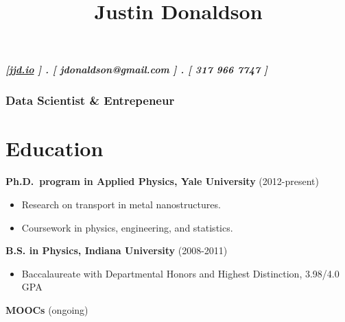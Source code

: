 \documentclass[
]{report}
\title{Justin Donaldson}
\author{}
\date{}
\let\oldparagraph\paragraph
\renewcommand{\paragraph}[1]{\oldparagraph{#1}\mbox{}}
\providecommand{\tightlist}{%
  \setlength{\itemsep}{0pt}\setlength{\parskip}{0pt}}\usepackage{longtable,booktabs,array}
\renewcommand*\contentsname{Table of contents}
\newcommand\contentsname{Table of contents}
\begin{document}
\maketitle
\ifdefined\Shaded\renewenvironment{Shaded}{\begin{tcolorbox}[frame hidden, borderline west={3pt}{0pt}{shadecolor}, enhanced, boxrule=0pt, interior hidden, breakable, sharp corners]}{\end{tcolorbox}}\fi

\renewcommand*\contentsname{Table of contents}
{
\hypersetup{linkcolor=}
\setcounter{tocdepth}{2}
\tableofcontents
}
\hypertarget{jjd.io-.-jdonaldsongmail.com-.-317-966-7747}{%
\paragraph{\texorpdfstring{{[}\href{http://jjd.io}{jjd.io} {]} . {[}
jdonaldson@gmail.com {]} . {[} 317 966 7747
{]}}{{[}jjd.io {]} . {[} jdonaldson@gmail.com {]} . {[} 317 966 7747 {]}}}\label{jjd.io-.-jdonaldsongmail.com-.-317-966-7747}}

\hypertarget{data-scientist-entrepeneur}{%
\subsection{Data Scientist \&
Entrepeneur}\label{data-scientist-entrepeneur}}

\hypertarget{education}{%
\chapter{Education}\label{education}}

\textbf{Ph.D.~program in Applied Physics, Yale University}
(2012-present)

\begin{itemize}
\tightlist
\item
  Research on transport in metal nanostructures.
\item
  Coursework in physics, engineering, and statistics.
\end{itemize}

\textbf{B.S. in Physics, Indiana University} (2008-2011)

\begin{itemize}
\tightlist
\item
  Baccalaureate with Departmental Honors and Highest Distinction,
  3.98/4.0 GPA
\end{itemize}

\textbf{MOOCs} (ongoing)
\end{document}
